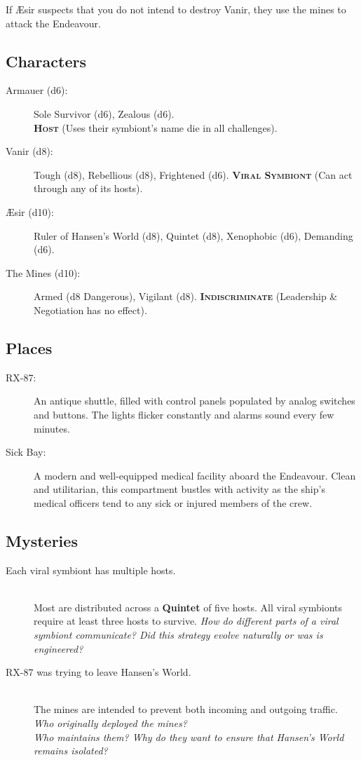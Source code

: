 \documentclass[11pt, a5paper, parskip=half-, DIV=12]{scrartcl}
\begin{document}
If \AE{}sir suspects that you do not intend to destroy Vanir, they use the mines to attack the Endeavour.
\newpage

\subsection*{Characters}
\begin{description}
	\item[Armauer (d6):] Sole Survivor (d6), Zealous (d6). \\
	\textbf{\textsc{Host}} (Uses their symbiont's name die in all challenges).
	\item[Vanir (d8):] Tough (d8), Rebellious (d8), Frightened (d6). \textbf{\textsc{Viral Symbiont}} (Can act through any of its hosts).
	\item[\AE{}sir (d10):] Ruler of Hansen's World (d8), Quintet (d8), Xenophobic (d6), Demanding (d6).%
	\item[The Mines (d10):] Armed (d8 Dangerous), Vigilant (d8). \textbf{\textsc{Indiscriminate}} (Leadership \& Negotiation has no effect).
\end{description}

\subsection*{Places}
\begin{description}
	\item[RX-87:] An antique shuttle, filled with control panels populated by analog switches and buttons. The lights flicker constantly and alarms sound every few minutes.%
	\item[Sick Bay:] A modern and well-equipped medical facility aboard the Endeavour. Clean and utilitarian, this compartment bustles with activity as the ship's medical officers tend to any sick or injured members of the crew.
\end{description}

\subsection*{Mysteries}
\begin{description}
	\item[Each viral symbiont has multiple hosts.] \phantom{a} \\ Most are distributed across a \textbf{Quintet} of five hosts. All viral symbionts require at least three hosts to survive. \textit{How do different parts of a viral symbiont communicate? Did this strategy evolve naturally or was is engineered?}
	\item[RX-87 was trying to leave Hansen's World.] \phantom{a} \\ The mines are intended to prevent both incoming and outgoing traffic. \textit{Who originally deployed the mines?  \\ Who maintains them? Why do they want to ensure that Hansen's World remains isolated?}
\end{description}
\end{document}
